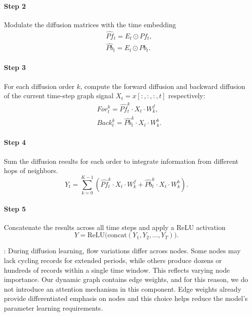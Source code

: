 \documentclass[preprint,12pt,authoryear]{elsarticle}
\begin{document}
\paragraph{Step 2} Modulate the diffusion matrices with the time embedding
\begin{align}
    & \hat{Pf}_t = E_t\odot Pf_t,\\
    & \hat{Pb}_t = E_t\odot Pb_t.
\end{align}

\paragraph{Step 3} For each diffusion order $k$, compute the forward diffusion and backward diffusion of the current time-step graph signal $X_t=x[:,:,:,t]$ respectively:
\begin{align}
& For_t^k = \hat{Pf}_t^k\cdot X_t\cdot W_k^f,\\
& Back_t^k = \hat{Pb}_t^k\cdot X_t\cdot W_k^b.
\end{align}

\paragraph{Step 4} Sum the diffusion results for each order to integrate information from different hops of neighbors.
\begin{equation}
Y_t = \sum_{k=0}^{K-1} \left( \hat{Pf}_t^k \cdot X_t \cdot W_k^f + \hat{Pb}_t^k \cdot X_t \cdot W_k^b \right).
\end{equation}

\paragraph{Step 5} Concatenate the results across all time steps and apply a ReLU activation
\begin{equation}
Y = \mathrm{ReLU}\bigl(\mathrm{concat}(Y_1, Y_2, \dots, Y_T)\bigr).
\end{equation}


: During diffusion learning, flow variations differ across nodes. Some nodes may lack cycling records for extended periods, while others produce dozens or hundreds of records within a single time window. This reflects varying node importance. Our dynamic graph contains edge weights, and for this reason, we do not introduce an attention mechanism in this component. Edge weights already provide differentiated emphasis on nodes and this choice helps reduce the model's parameter learning requirements.
\end{document}
